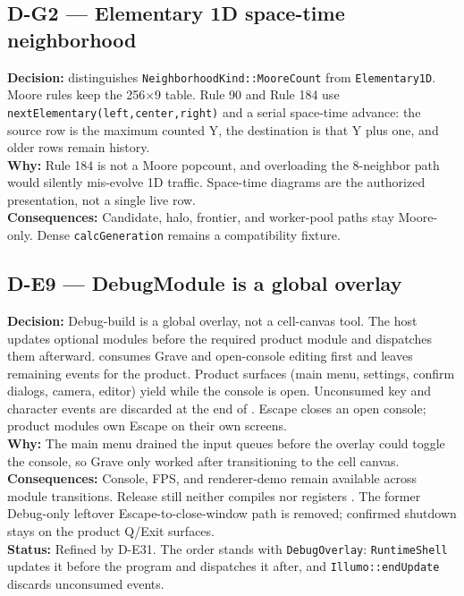 \subsection*{D-G2 --- Elementary 1D space-time neighborhood}
\begin{decisionbox}[title={D-G2 \quad 2026-08-21}]
\textbf{Decision:}  distinguishes
\texttt{NeighborhoodKind::MooreCount} from \texttt{Elementary1D}. Moore rules
keep the 256$\times$9 table. Rule 90 and Rule 184 use
\texttt{nextElementary(left,center,right)} and a serial space-time
 advance: the source row is the maximum counted Y,
the destination is that Y plus one, and older rows remain history.\\
\textbf{Why:} Rule 184 is not a Moore popcount, and overloading the 8-neighbor
path would silently mis-evolve 1D traffic. Space-time diagrams are the
authorized presentation, not a single live row.\\
\textbf{Consequences:} Candidate, halo, frontier, and worker-pool paths stay
Moore-only. Dense \texttt{calcGeneration} remains a compatibility fixture.
\end{decisionbox}

\subsection*{D-E9 --- DebugModule is a global overlay}
\begin{decisionbox}[title={D-E9 \quad 2026-08-29}]
\textbf{Decision:} Debug-build  is a global overlay, not
a cell-canvas tool. The host updates optional modules before the required
product module and dispatches them afterward.  consumes
Grave and open-console editing first and leaves remaining events for the
product. Product surfaces (main menu, settings, confirm dialogs, camera,
editor) yield while the console is open. Unconsumed key and character events
are discarded at the end of . Escape closes an open
console; product modules own Escape on their own screens.\\
\textbf{Why:} The main menu drained the input queues before the overlay could
toggle the console, so Grave only worked after transitioning to the cell
canvas.\\
\textbf{Consequences:} Console, FPS, and renderer-demo remain available across
module transitions. Release still neither compiles nor registers
. The former Debug-only leftover Escape-to-close-window
path is removed; confirmed shutdown stays on the product Q/Exit surfaces.\\
\textbf{Status:} Refined by D-E31. The order stands with
\texttt{DebugOverlay}: \texttt{RuntimeShell} updates it before the program and
dispatches it after, and \texttt{Illumo::endUpdate} discards unconsumed
events.
\end{decisionbox}

